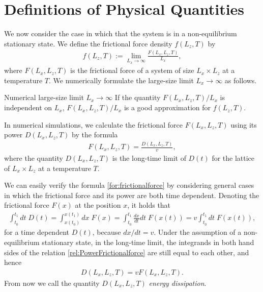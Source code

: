 \section{Definitions of Physical Quantities}

We now consider the case in which that the system is in a non-equilibrium stationary state. We define the frictional force density $f(L_{z}, T)$ by
\begin{align}
f(L_{z}, T):=\lim_{L_{x}\to\infty}\frac{F(L_{x}, L_{z}, T)}{L_{x}},
\end{align}
where $F(L_{x}, L_{z}, T)$ is the frictional force of a system of size $L_{x}\times L_{z}$ at a temperature $T$. We numerically formulate the  large-size limit $L_{x}\to\infty$ as follows.
\begin{itembox}{Numerical large-size limit $L_{x}\to\infty$}
	If the quantity $F(L_{x}, L_{z}, T)/L_{x}$ is independent on $L_{x}$, $F(L_{x}, L_{z}, T)/L_{x}$ is a good approximation for $f(L_{z}, T)$.
\end{itembox}
In numerical simulations, we calculate the frictional force $F(L_{x}, L_{z}, T)$ using its power $D(L_{x}, L_{z}, T)$ by the formula
\begin{align}
F(L_{x}, L_{z}, T)=\frac{D(L_{x}, L_{z}, T)}{v}\label{for:frictionalforce},
\end{align}
where the quantity $D(L_{x}, L_{z}, T)$ is the long-time limit of $D(t)$ for the lattice of $L_{x}\times L_{z}$ at a temperature $T$.

We can easily verify the formula \eqref{for:frictionalforce} by considering general cases in which the frictional force and its power are both time dependent. Denoting the frictional force $F(x)$ at the position $x$, it holds that
\begin{align}
\int_{t_{0}}^{t_{1}}dt\;D(t)=\int_{x(t_{0})}^{x(t_{1})}dx\;F(x)=\int_{t_{0}}^{t_{1}}\frac{dx}{dt}dt\;F(x(t))=v\int_{t_{0}}^{t_{1}}dt\;F(x(t))\label{rel:PowerFrictionalforce},
\end{align}
for a time dependent $D(t)$, because $dx/dt=v$. Under the assumption of a non-equilibrium stationary state, in the long-time limit, the integrands in both hand sides of the relation \eqref{rel:PowerFrictionalforce} are still equal to each other, and hence 
\begin{align}
D(L_{x}, L_{z}, T)=vF(L_{x}, L_{z}, T).
\end{align}
From now we call the quantity $D(L_{x}, L_{z}, T)$ \textit{energy dissipation}.


